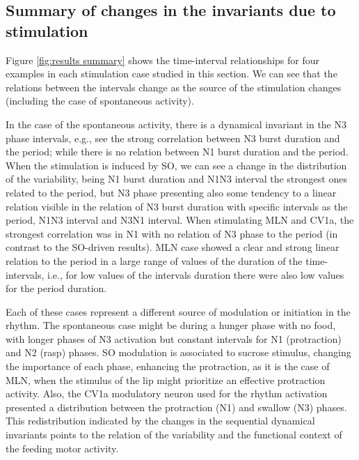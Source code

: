 \subsection{Summary of changes in the invariants due to stimulation}
Figure \ref{fig:results summary} shows the time-interval relationships for four examples in each stimulation case studied in this section. We can see that the relations between the intervals change as the source of the stimulation changes (including the case of spontaneous activity).

In the case of the spontaneous activity, there is a dynamical invariant in the N3 phase intervals, e.g., see the strong correlation between N3 burst duration and the period; while there is no relation between N1 burst duration and the period. When the stimulation is induced by SO, we can see a change in the distribution of the variability, being N1 burst duration and N1N3 interval the strongest ones related to the period, but N3 phase presenting also some tendency to a linear relation visible in the relation of N3 burst duration with specific intervals as the period, N1N3 interval and N3N1 interval. When stimulating MLN and CV1a, the strongest correlation was in N1 with no relation of N3 phase to the period (in contrast to the SO-driven results). MLN case showed a clear and strong linear relation to the period in a large range of values of the duration of the time-intervals, i.e., for low values of the intervals duration there were also low values for the period duration. 

Each of these cases represent a different source of modulation or initiation in the rhythm. The spontaneous case might be during a hunger phase with no food, with longer phases of N3 activation but constant intervals for N1 (protraction) and N2 (rasp) phases. SO modulation is associated to sucrose stimulus, changing the importance of each phase, enhancing the protraction, as it is the case of MLN, when the stimulus of the lip might prioritize an effective protraction activity. Also, the CV1a modulatory neuron used for the rhythm activation presented a distribution between the protraction (N1) and swallow (N3) phases. This redistribution indicated by the changes in the sequential dynamical invariants points to the relation of the variability and the functional context of the feeding motor activity.

